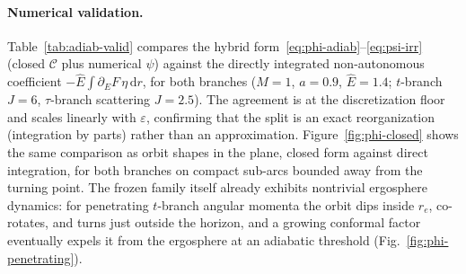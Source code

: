 \documentclass[12pt]{iopart}
\newcommand{\Ehat}{\hat E}
\newcommand{\dd}{\mathrm{d}}
\begin{document}
\paragraph{Numerical validation.} Table~\ref{tab:adiab-valid} compares the
hybrid form~\eqref{eq:phi-adiab}--\eqref{eq:psi-irr} (closed
$\mathcal{C}$ plus numerical $\psi$) against the directly integrated non-autonomous
coefficient $-\Ehat\!\int\partial_E F\,\eta\,\dd r$, for both branches
($M=1$, $a=0.9$, $\Ehat=1.4$; $t$-branch $J=6$, $\tau$-branch scattering $J=2.5$).
The agreement is at the discretization floor and scales linearly with
$\varepsilon$, confirming that the split is an exact reorganization (integration by
parts) rather than an approximation. Figure~\ref{fig:phi-closed} shows the same
comparison as orbit shapes in the plane, closed form against direct integration,
for both branches on compact sub-arcs bounded away from the turning point. The frozen family
itself already exhibits nontrivial ergosphere dynamics: for penetrating $t$-branch
angular momenta the orbit dips inside $r_e$, co-rotates, and turns just outside the
horizon, and a growing conformal factor eventually expels it from the ergosphere at
an adiabatic threshold (Fig.~\ref{fig:phi-penetrating}).
\end{document}

